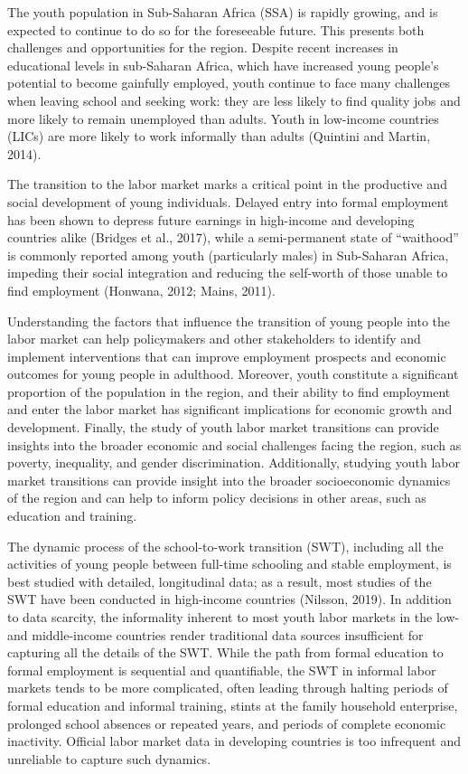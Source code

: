 \documentclass[
  11pt,
a4paper
]{article}
\begin{document}
The youth population in Sub-Saharan Africa (SSA) is rapidly growing, and is expected to continue to do so for the foreseeable future. This presents both challenges and opportunities for the region. Despite recent increases in educational levels in sub-Saharan Africa, which have increased young people's potential to become gainfully employed, youth continue to face many challenges when leaving school and seeking work: they are less likely to find quality jobs and more likely to remain unemployed than adults. Youth in low-income countries (LICs) are more likely to work informally than adults (Quintini and Martin, 2014).

The transition to the labor market marks a critical point in the productive and social development of young individuals. Delayed entry into formal employment has been shown to depress future earnings in high-income and developing countries alike (Bridges et al., 2017), while a semi-permanent state of ``waithood'' is commonly reported among youth (particularly males) in Sub-Saharan Africa, impeding their social integration and reducing the self-worth of those unable to find employment (Honwana, 2012; Mains, 2011).

Understanding the factors that influence the transition of young people into the labor market can help policymakers and other stakeholders to identify and implement interventions that can improve employment prospects and economic outcomes for young people in adulthood. Moreover, youth constitute a significant proportion of the population in the region, and their ability to find employment and enter the labor market has significant implications for economic growth and development. Finally, the study of youth labor market transitions can provide insights into the broader economic and social challenges facing the region, such as poverty, inequality, and gender discrimination. Additionally, studying youth labor market transitions can provide insight into the broader socioeconomic dynamics of the region and can help to inform policy decisions in other areas, such as education and training.

The dynamic process of the school-to-work transition (SWT), including all the activities of young people between full-time schooling and stable employment, is best studied with detailed, longitudinal data; as a result, most studies of the SWT have been conducted in high-income countries (Nilsson, 2019). In addition to data scarcity, the informality inherent to most youth labor markets in the low- and middle-income countries render traditional data sources insufficient for capturing all the details of the SWT. While the path from formal education to formal employment is sequential and quantifiable, the SWT in informal labor markets tends to be more complicated, often leading through halting periods of formal education and informal training, stints at the family household enterprise, prolonged school absences or repeated years, and periods of complete economic inactivity. Official labor market data in developing countries is too infrequent and unreliable to capture such dynamics.
\end{document}
